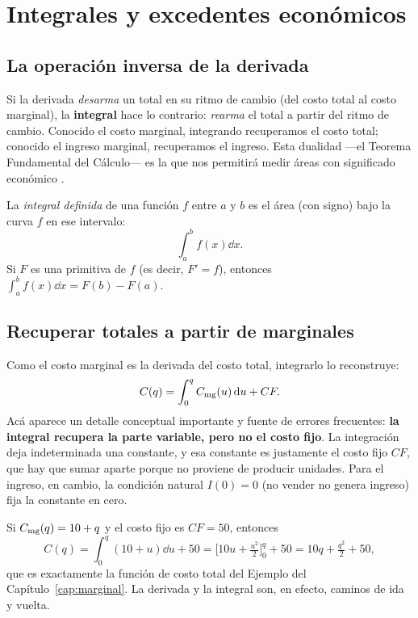 \chapter{Integrales y excedentes económicos}
\label{cap:integrales}

\section{La operación inversa de la derivada}

Si la derivada \emph{desarma} un total en su ritmo de cambio (del costo total al costo marginal), la \textbf{integral} hace lo contrario: \emph{rearma} el total a partir del ritmo de cambio. Conocido el costo marginal, integrando recuperamos el costo total; conocido el ingreso marginal, recuperamos el ingreso. Esta dualidad —el Teorema Fundamental del Cálculo— es la que nos permitirá medir áreas con significado económico \cite{chiang}.

\begin{definicion}
La \emph{integral definida} de una función $f$ entre $a$ y $b$ es el área (con signo) bajo la curva $f$ en ese intervalo:
\[
\int_a^b f(x)\dd x .
\]
Si $F$ es una primitiva de $f$ (es decir, $F'=f$), entonces $\displaystyle\int_a^b f(x)\dd x = F(b)-F(a)$.
\end{definicion}

\section{Recuperar totales a partir de marginales}

Como el costo marginal es la derivada del costo total, integrarlo lo reconstruye:
\begin{equation}
C(q) = \int_0^q C_{\mathrm{mg}}(u)\,\mathrm{d} u + CF.
\label{eq:costo_desde_cmg}
\end{equation}
Acá aparece un detalle conceptual importante y fuente de errores frecuentes: \textbf{la integral recupera la parte variable, pero no el costo fijo}. La integración deja indeterminada una constante, y esa constante es justamente el costo fijo $CF$, que hay que sumar aparte porque no proviene de producir unidades. Para el ingreso, en cambio, la condición natural $I(0)=0$ (no vender no genera ingreso) fija la constante en cero.

\begin{ejemplo}
Si $C_{\mathrm{mg}}(q) = 10 + q$ y el costo fijo es $CF=50$, entonces
\[
C(q) = \int_0^q (10+u)\dd u + 50 = \Big[10u + \tfrac{u^2}{2}\Big]_0^q + 50 = 10q + \tfrac{q^2}{2} + 50,
\]
que es exactamente la función de costo total del Ejemplo del Capítulo~\ref{cap:marginal}. La derivada y la integral son, en efecto, caminos de ida y vuelta.
\end{ejemplo}

